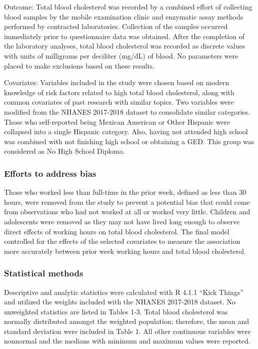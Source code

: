 \documentclass[]{elsarticle} %
\begin{document}
Outcome: Total blood cholesterol was recorded by a combined effort of
collecting blood samples by the mobile examination clinic and enzymatic
assay methods performed by contracted laboratories. Collection of the
samples occurred immediately prior to questionnaire data was obtained.
After the completion of the laboratory analyses, total blood cholesterol
was recorded as discrete values with units of milligrams per deciliter
(mg/dL) of blood. No parameters were placed to make exclusions based on
these results.

Covariates: Variables included in the study were chosen based on modern
knowledge of risk factors related to high total blood cholesterol, along
with common covariates of past research with similar topics. Two
variables were modified from the NHANES 2017-2018 dataset to consolidate
similar categories. Those who self-reported being Mexican American or
Other Hispanic were collapsed into a single Hispanic category. Also,
having not attended high school was combined with not finishing high
school or obtaining a GED. This group was considered as No High School
Diploma.

\hypertarget{efforts-to-address-bias}{%
\subsubsection{Efforts to address bias}\label{efforts-to-address-bias}}

Those who worked less than full-time in the prior week, defined as less
than 30 hours, were removed from the study to prevent a potential bias
that could come from observations who had not worked at all or worked
very little. Children and adolescents were removed as they may not have
lived long enough to observe direct effects of working hours on total
blood cholesterol. The final model controlled for the effects of the
selected covariates to measure the association more accurately between
prior week working hours and total blood cholesterol.

\hypertarget{statistical-methods}{%
\subsubsection{Statistical methods}\label{statistical-methods}}

Descriptive and analytic statistics were calculated with R 4.1.1 ``Kick
Things'' and utilized the weights included with the NHANES 2017-2018
dataset. No unweighted statistics are listed in Tables 1-3. Total blood
cholesterol was normally distributed amongst the weighted population;
therefore, the mean and standard deviation were included in Table 1. All
other continuous variables were nonnormal and the medians with minimum
and maximum values were reported.
\end{document}
